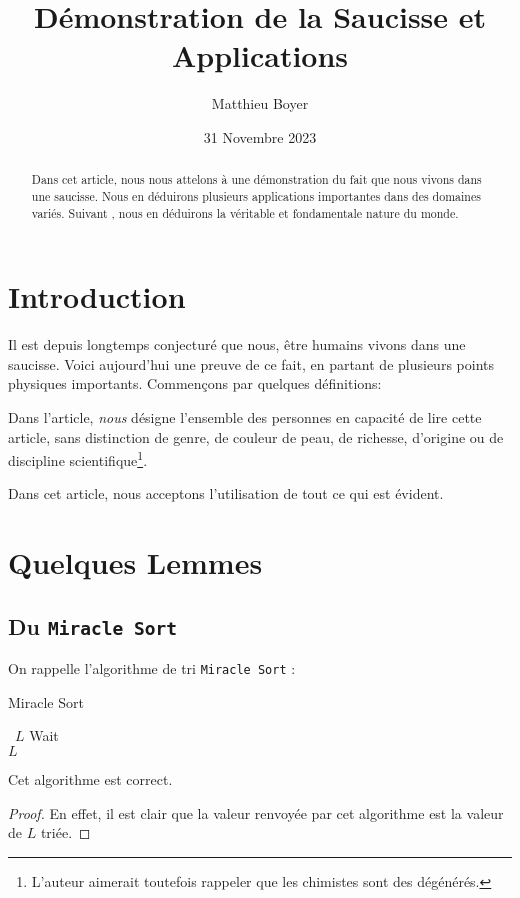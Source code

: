 \documentclass{cours}
\title{Démonstration de la Saucisse et Applications}
\author{Matthieu Boyer}
\date{31 Novembre 2023}
\begin{document}
\begin{abstract}
    Dans cet article, nous nous attelons à une démonstration du fait que nous vivons dans une saucisse. Nous en déduirons plusieurs applications importantes dans des domaines variés. Suivant \cite{uvc}, nous en déduirons la véritable et fondamentale nature du monde.
\end{abstract}

\section*{Introduction}
Il est depuis longtemps conjecturé que nous, être humains vivons dans une saucisse. Voici aujourd'hui une preuve de ce fait, en partant de plusieurs points physiques importants. Commençons par quelques définitions:  
\begin{definition}
    Dans l'article, \emph{nous} désigne l'ensemble des personnes en capacité de lire cette article, sans distinction de genre, de couleur de peau, de richesse, d'origine ou de discipline scientifique\footnote{L'auteur aimerait toutefois rappeler que les chimistes sont des dégénérés.}. 
\end{definition}

Dans cet article, nous acceptons l'utilisation de tout ce qui est évident. 


\section{Quelques Lemmes}
\subsection{Du \texttt{Miracle Sort}}
On rappelle l'algorithme de tri \texttt{Miracle Sort} :
\begin{algorithm}\label{msort}
    \caption{Miracle Sort}
    \begin{algorithmic}
        \Input \ $L$
        \EndInput
            \State Wait
        \EndWhile\\
        \Return $L$
    \end{algorithmic}
\end{algorithm}

\begin{proposition}
    Cet algorithme est correct.
\end{proposition}
\begin{proof}
    En effet, il est clair que la valeur renvoyée par cet algorithme est la valeur de $L$ triée. 
\end{proof}
\end{document}
